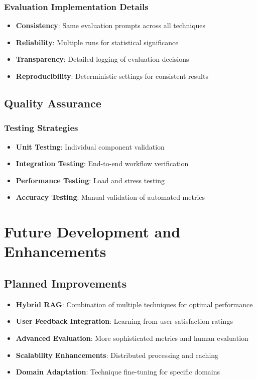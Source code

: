 \documentclass[12pt,a4paper]{article}
\begin{document}
\begin{itemize}
\subsubsection{Evaluation Implementation Details}
\begin{itemize}
    \item \textbf{Consistency}: Same evaluation prompts across all techniques
    \item \textbf{Reliability}: Multiple runs for statistical significance
    \item \textbf{Transparency}: Detailed logging of evaluation decisions
    \item \textbf{Reproducibility}: Deterministic settings for consistent results
\end{itemize}

\subsection{Quality Assurance}

\subsubsection{Testing Strategies}
\begin{itemize}
    \item \textbf{Unit Testing}: Individual component validation
    \item \textbf{Integration Testing}: End-to-end workflow verification
    \item \textbf{Performance Testing}: Load and stress testing
    \item \textbf{Accuracy Testing}: Manual validation of automated metrics
\end{itemize}

\section{Future Development and Enhancements}

\subsection{Planned Improvements}
\begin{itemize}
    \item \textbf{Hybrid RAG}: Combination of multiple techniques for optimal performance
    \item \textbf{User Feedback Integration}: Learning from user satisfaction ratings
    \item \textbf{Advanced Evaluation}: More sophisticated metrics and human evaluation
    \item \textbf{Scalability Enhancements}: Distributed processing and caching
    \item \textbf{Domain Adaptation}: Technique fine-tuning for specific domains
\end{itemize}


\end{itemize}
\end{document}
